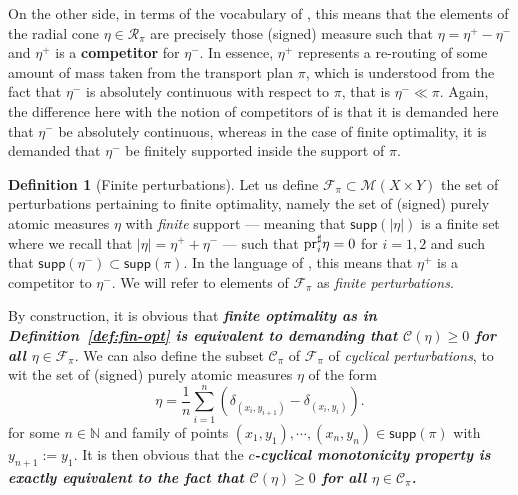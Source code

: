 \documentclass[leqno, 11pt, a4paper]{amsart}
\theoremstyle{definition}
\newtheorem{defi}{Definition}
\newcommand{\cR}{\mathcal{R}}
\newcommand{\cC}{\mathcal{C}}
\newcommand{\C}{\mathscr{C}}
\newcommand{\N}{\mathbb{N}}
\newcommand{\cF}{\mathcal{F}}
\newcommand{\cM}{\mathcal{M}}
\newcommand{\supp}{\textsf{supp}}
\newcommand{\pr}{{\rm pr}}
\begin{document}
	
	On the other side, in terms of the vocabulary of \cite{beiglbockLandMonotonePlenty2019b}, this means that the elements of the radial cone $\eta \in \cR_\pi$ are precisely those (signed) measure such that $\eta = \eta^+ - \eta^-$ and $\eta^+$ is a \textbf{competitor} for $\eta^-$. In essence, $\eta^+$ represents a re-routing of some amount of mass taken from the transport plan $\pi$, which is understood from the fact that $\eta^-$ is absolutely continuous with respect to $\pi$, that is $\eta^- \ll \pi$. Again, the difference here with the notion of competitors of \cite{beiglbockLandMonotonePlenty2019b} is that it is demanded here that $\eta^-$ be absolutely continuous, whereas in the case of finite optimality, it is demanded that $\eta^-$ be finitely supported inside the support of $\pi$.
	

\medskip

\begin{defi}[Finite perturbations]
    Let us define $\cF_\pi \subset \cM(X \times Y)$ the set of perturbations pertaining to finite optimality, namely the set of (signed) purely atomic measures $\eta$ with \textit{finite} support — meaning that $\supp(|\eta|)$ is a finite set where we recall that $|\eta| = \eta^+ + \eta^-$ — such that $\pr_i^\sharp \eta = 0$ for $i = 1, 2$ and such that $\supp(\eta^-) \subset \supp(\pi)$. In the language of \cite{beiglbockLandMonotonePlenty2019b}, this means that $\eta^+$ is a competitor to $\eta^-$. We will refer to elements of $\cF_\pi$ as \textit{finite perturbations}.
\end{defi}
By construction, it is obvious that \textbf{\textit{finite optimality as in Definition~\ref{def:fin-opt} is equivalent to demanding that $\C(\eta) \geq 0$ for all $\eta \in \cF_\pi$}}. We can also define the subset $\cC_\pi$ of $\cF_\pi$ of \textit{cyclical perturbations}, to wit the set of (signed) purely atomic measures $\eta$ of the form
	$$
	\eta = \frac1n \sum_{i = 1}^n (\delta_{(x_i, y_{i+1})} - \delta_{(x_i, y_i)}).
	$$
for some $n \in \N$ and family of points $(x_1, y_1), \cdots, (x_n, y_n) \in \supp(\pi)$ with $y_{n+1} := y_1$. It is then obvious that the \textbf{\textit{$c$-cyclical monotonicity property is exactly equivalent to the fact that $\C(\eta) \geq 0$ for all $\eta \in \cC_\pi$.} }
\end{document}
